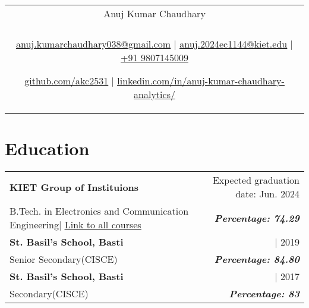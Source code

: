 \documentclass[a4paper,8pt]{article}
\begin{document}
\pagestyle{empty} 


\begin{tabularx}{\linewidth}{@{} C @{}}
\color[HTML]{1C033C} \Huge{Anuj Kumar Chaudhary} \\[6pt]
\\
\textcolor[HTML]{371e77}{\underline{\href{mailto:anuj.kumarchaudhary038@gmail.com}{\raisebox{-0.05\height}{\faEnvelope} anuj.kumarchaudhary038@gmail.com}} $|$}
\textcolor[HTML]{371e77}{\underline{\href{mailto:anuj.2024ec1144@kiet.edu}{\raisebox{-0.05\height}{\faEnvelope} anuj.2024ec1144@kiet.edu}} $|$}
\textcolor[HTML]{371e77}{\href{tel:+919807145009}{\raisebox{-0.05\height}{\faMobile} +91 9807145009}}

\textcolor[HTML]{371e77}{\underline{\href{https://github.com/akc2531}{\raisebox{-0.05\height}{\faGithub} github.com/akc2531}} $|$}
\textcolor[HTML]{371e77}{\underline{\href{https://www.linkedin.com/in/anuj-kumar-chaudhary-analytics/}{\raisebox{-0.05\height}{\faLinkedin} linkedin.com/in/anuj-kumar-chaudhary-analytics/}}}
\end{tabularx}

\section{Education}
\begin{tabularx}{\linewidth}{ @{}l r@{} }
\color[HTML]{1C033C} \textbf{KIET Group of Instituions} & \hfill \color[HTML]{371e77} Expected graduation date: Jun. 2024 \\
\color[HTML]{371e77} B.Tech. in Electronics and Communication Engineering$|$ {\uline{\href{https://akc2531.github.io/MyPortfolio/}{Link to all courses}}} & \hfill \color[HTML]{4B28A4} \textit{\textbf{Percentage: 74.29}} \\
\color[HTML]{1C033C} \textbf{St. Basil's School, Basti} & \hfill \color[HTML]{371e77} | 2019 \\
\color[HTML]{371e77} Senior Secondary(CISCE)  & \hfill \color[HTML]{4B28A4} \textit{\textbf{Percentage: 84.80}} \\
\color[HTML]{1C033C} \textbf{St. Basil's School, Basti} & \hfill \color[HTML]{371e77} | 2017 \\
\color[HTML]{371e77} Secondary(CISCE)  & \hfill \color[HTML]{4B28A4} \textit{\textbf{Percentage: 83}} \\
\end{tabularx}


\end{document}
